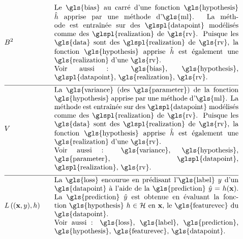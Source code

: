 \begin{align}
	& \biasterm^2 & \quad & \parbox{.75\textwidth}{
	Le \gls{bias} au carré d’une fonction \gls{hypothesis} $\learnthypothesis$ apprise par une méthode d’\gls{ml}. La méthode est entraînée sur des \glspl{datapoint} modélisés comme des \glspl{realization} de \gls{rv}. Puisque les \gls{data} sont des \glspl{realization} de \gls{rv}, la fonction \gls{hypothesis} apprise $\learnthypothesis$ est également une \gls{realization} d’une \gls{rv}. \\ Voir aussi : \gls{bias}, \gls{hypothesis}, \glspl{datapoint}, \gls{realization}, \gls{rv}.} \nonumber \\[2mm] \hline \nonumber\\[-5mm]
	& \varianceterm & \quad & \parbox{.75\textwidth}{La \gls{variance} (des \gls{parameter}) de la fonction \gls{hypothesis} apprise par une méthode d’\gls{ml}. La méthode est entraînée sur des \glspl{datapoint} modélisés comme des \glspl{realization} de \gls{rv}. Puisque les \gls{data} sont des \glspl{realization} de \gls{rv}, la fonction \gls{hypothesis} apprise $\learnthypothesis$ est également une \gls{realization} d’une \gls{rv}. \\ Voir aussi : \gls{variance}, \gls{hypothesis}, \gls{parameter}, \glspl{datapoint}, \glspl{realization}, \gls{rv}.} \nonumber \\[2mm] \hline \nonumber\\[-5mm]
	& \lossfunc{(\featurevec,\truelabel)}{\hypothesis} & \quad & \parbox{.75\textwidth}{La \gls{loss} encourue en prédisant l'\gls{label} $\truelabel$ d’un \gls{datapoint} à l’aide de la \gls{prediction} $\hat{\truelabel}=h(\featurevec)$. La \gls{prediction} $\hat{\truelabel}$ est obtenue en évaluant la fonction \gls{hypothesis} $\hypothesis \in \hypospace$ en $\featurevec$, le \gls{featurevec} du \gls{datapoint}. \\ Voir aussi : \gls{loss}, \gls{label}, \gls{prediction}, \gls{hypothesis}, \gls{featurevec}, \gls{datapoint}.} \nonumber
\end{align}

